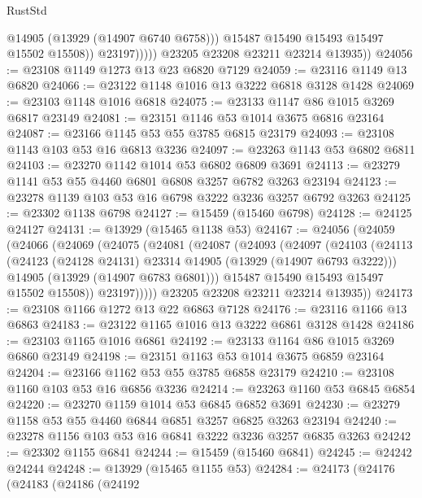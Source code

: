 \begin{lexlean}{RustStd}
\begin{coremodule}
                        @14905
                        (@13929 (@14907 @6740 @6758)))
                      @15487
                      @15490
                      @15493
                      @15497
                      @15502
                      @15508))
                  @23197)))))
        @23205
        @23208
        @23211
        @23214
        @13935))
@24056 := @23108 @1149 @1273 @13 @23 @6820 @7129
@24059 := @23116 @1149 @13 @6820
@24066 := @23122 @1148 @1016 @13 @3222 @6818 @3128 @1428
@24069 := @23103 @1148 @1016 @6818
@24075 := @23133 @1147 @86 @1015 @3269 @6817 @23149
@24081 := @23151 @1146 @53 @1014 @3675 @6816 @23164
@24087 := @23166 @1145 @53 @55 @3785 @6815 @23179
@24093 := @23108 @1143 @103 @53 @16 @6813 @3236
@24097 := @23263 @1143 @53 @6802 @6811
@24103 := @23270 @1142 @1014 @53 @6802 @6809 @3691
@24113 := @23279 @1141 @53 @55 @4460 @6801 @6808 @3257 @6782 @3263 @23194
@24123 := @23278 @1139 @103 @53 @16 @6798 @3222 @3236 @3257 @6792 @3263
@24125 := @23302 @1138 @6798
@24127 := @15459 (@15460 @6798)
@24128 := @24125 @24127
@24131 := @13929 (@15465 @1138 @53)
@24167 := @24056
    (@24059
      (@24066
        (@24069
          (@24075
            (@24081
              (@24087
                (@24093
                  (@24097
                    (@24103
                      (@24113
                        (@24123 (@24128 @24131) @23314 @14905 (@13929 (@14907 @6793 @3222)))
                        @14905
                        (@13929 (@14907 @6783 @6801)))
                      @15487
                      @15490
                      @15493
                      @15497
                      @15502
                      @15508))
                  @23197)))))
        @23205
        @23208
        @23211
        @23214
        @13935))
@24173 := @23108 @1166 @1272 @13 @22 @6863 @7128
@24176 := @23116 @1166 @13 @6863
@24183 := @23122 @1165 @1016 @13 @3222 @6861 @3128 @1428
@24186 := @23103 @1165 @1016 @6861
@24192 := @23133 @1164 @86 @1015 @3269 @6860 @23149
@24198 := @23151 @1163 @53 @1014 @3675 @6859 @23164
@24204 := @23166 @1162 @53 @55 @3785 @6858 @23179
@24210 := @23108 @1160 @103 @53 @16 @6856 @3236
@24214 := @23263 @1160 @53 @6845 @6854
@24220 := @23270 @1159 @1014 @53 @6845 @6852 @3691
@24230 := @23279 @1158 @53 @55 @4460 @6844 @6851 @3257 @6825 @3263 @23194
@24240 := @23278 @1156 @103 @53 @16 @6841 @3222 @3236 @3257 @6835 @3263
@24242 := @23302 @1155 @6841
@24244 := @15459 (@15460 @6841)
@24245 := @24242 @24244
@24248 := @13929 (@15465 @1155 @53)
@24284 := @24173
    (@24176
      (@24183
        (@24186
          (@24192

\end{coremodule}
\end{lexlean}
